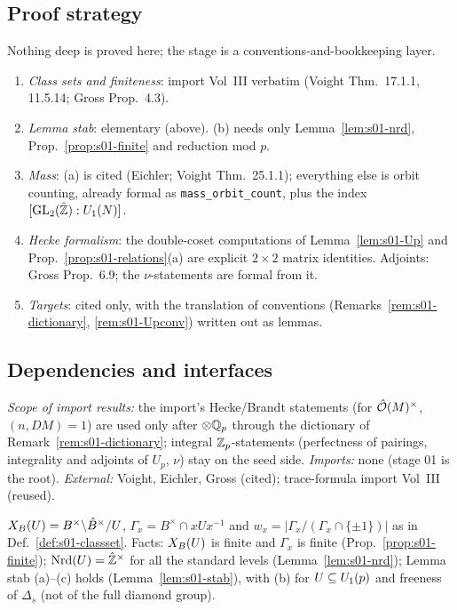 \subsection{Proof strategy}
Nothing deep is proved here; the stage is a conventions-and-bookkeeping layer.
\begin{enumerate}
\item \emph{Class sets and finiteness}: import Vol~III verbatim (Voight Thm.~17.1.1, 11.5.14; Gross Prop.~4.3).
\item \emph{Lemma stab}: elementary (above). (b) needs only Lemma~\ref{lem:s01-nrd}, Prop.~\ref{prop:s01-finite} and reduction mod $p$.
\item \emph{Mass}: (a) is cited (Eichler; Voight Thm.~25.1.1); everything else is orbit counting, already formal as
  \texttt{mass\_orbit\_count}, plus the index $[\mathrm{GL}_2(\hat{\mathbb{Z}}):U_1(N)]$.
\item \emph{Hecke formalism}: the double-coset computations of Lemma~\ref{lem:s01-Up} and Prop.~\ref{prop:s01-relations}(a) are
  explicit $2\times2$ matrix identities. Adjoints: Gross Prop.~6.9; the $\nu$-statements are formal from it.
\item \emph{Targets}: cited only, with the translation of conventions (Remarks~\ref{rem:s01-dictionary},
  \ref{rem:s01-Upconv}) written out as lemmas.
\end{enumerate}

\subsection{Dependencies and interfaces}
\emph{Scope of import results:} the import's Hecke/Brandt statements (for $\hat{\mathcal{O}}(M)^\times$, $(n,DM)=1$) are used only after $\otimes\mathbb{Q}_p$ through the dictionary
of Remark~\ref{rem:s01-dictionary}; integral $\mathbb{Z}_p$-statements (perfectness of pairings, integrality and adjoints of $U_p$, $\nu$) stay on the seed side.
\emph{Imports:} none (stage 01 is the root). \emph{External:} Voight, Eichler, Gross (cited); trace-formula import Vol~III (reused).

\begin{interface}\label{if:s01-classset}
$X_B(U)=B^\times\backslash\hat{B}^\times/U$, $\Gamma_x=B^\times\cap xUx^{-1}$ and $w_x=|\Gamma_x/(\Gamma_x\cap\{\pm1\})|$ as in
Def.~\ref{def:s01-classset}. Facts: $X_B(U)$ is finite and $\Gamma_x$ is finite (Prop.~\ref{prop:s01-finite});
$\mathrm{Nrd}(U)=\hat{\mathbb{Z}}^\times$ for all the standard levels (Lemma~\ref{lem:s01-nrd}); Lemma stab (a)--(c) holds (Lemma~\ref{lem:s01-stab}),
with (b) for $U\subseteq U_1(p)$ and freeness of $\Delta_s$ (not of the full diamond group).
\end{interface}

